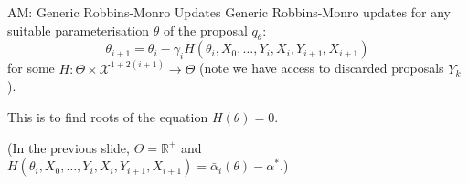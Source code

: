 \documentclass[aspectratio=169]{beamer}
\begin{document}
\begin{frame}{AM: Generic Robbins-Monro Updates}
    Generic Robbins-Monro updates for any suitable parameterisation $\theta$ of the proposal $q_\theta$: 
    $$\theta_{i+1} = \theta_i - \gamma_i H(\theta_i, X_0, \ldots, Y_i, X_i, Y_{i+1}, X_{i+1})$$
    for some $H: \Theta \times \mathcal{X}^{1 + 2(i+1)} \to \Theta$ (note we have access to discarded proposals $Y_k$).
    
    \vspace{1em}
    This is to find roots of the equation $H(\theta) = 0$.

    \pause 
    \vspace{1em}
    (In the previous slide, $\Theta = \mathbb{R}^+$ and $H(\theta_i, X_0, \ldots, Y_i, X_i, Y_{i+1}, X_{i+1}) = \bar{\alpha}_i(\theta) - \alpha^*$.)
    




\end{frame}
\end{document}
